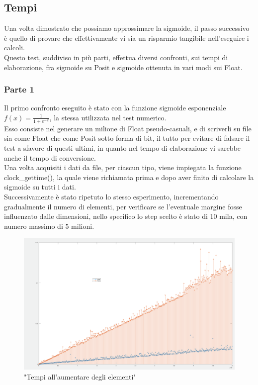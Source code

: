 \documentclass[a4paper,11pt]{article}
\begin{document}
\subsection{Tempi}

Una volta dimostrato che possiamo approssimare la sigmoide, il passo successivo è quello di provare che effettivamente vi sia un risparmio tangibile nell'eseguire i calcoli. \\
Questo test, suddiviso in più parti, effettua diversi confronti, sui tempi di elaborazione, fra sigmoide su Posit e sigmoide ottenuta in vari modi sui Float.

\subsubsection{Parte 1}

Il primo confronto eseguito è stato con la funzione sigmoide esponenziale  $ f(x) = \frac {1}{1 + e^{-x}} $, la stessa utilizzata nel test numerico.\\
Esso consiste nel generare un milione di Float pseudo-casuali, e di scriverli su file sia come Float che come Posit sotto forma di bit, il tutto per evitare di falsare il test a sfavore di questi ultimi, in quanto nel tempo di elaborazione vi sarebbe anche il tempo di conversione. \\
Una volta acquisiti i dati da file, per ciascun tipo, viene impiegata la funzione clock\_gettime(), la quale viene richiamata prima e dopo aver finito di calcolare la sigmoide su tutti i dati.\\
Successivamente è stato ripetuto lo stesso esperimento, incrementando gradualmente il numero di elementi, per verificare se l'eventuale margine fosse influenzato dalle dimensioni, nello specifico lo step scelto è stato di 10 mila, con numero massimo di 5 milioni.

\begin{figure}[h]
	\includegraphics[scale=0.15]{tempi}
	\centering
	\caption{"Tempi all'aumentare degli elementi"}
\end{figure}
\end{document}
